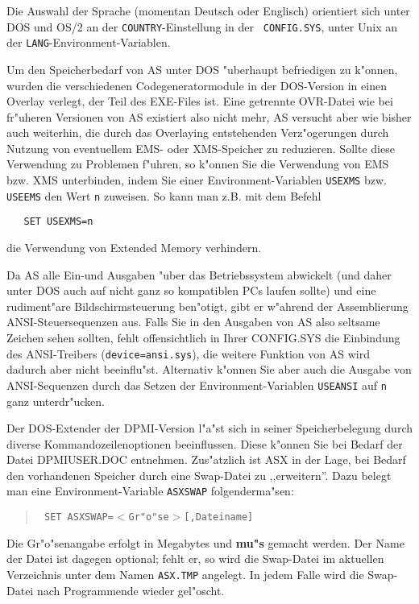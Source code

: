 \documentclass[12pt,a4paper,twoside]{report}
\newcommand{\bb}[1]{{\bf #1}}
\newcommand{\tty}[1]{{\tt #1}}
\begin{document}
Die Auswahl der Sprache (momentan Deutsch oder Englisch) orientiert sich
unter DOS und OS/2 an der {\tt COUNTRY}-Einstellung in der {\tt
CONFIG.SYS}, unter Unix an der {\tt LANG}-Environment-Variablen.

Um den  Speicherbedarf von AS unter DOS "uberhaupt
befriedigen zu k"onnen, wurden die verschiedenen Codegeneratormodule in
der DOS-Version in einen Overlay verlegt, der Teil des EXE-Files ist.
Eine getrennte OVR-Datei wie bei fr"uheren Versionen von AS existiert also
nicht mehr, AS versucht aber wie bisher auch weiterhin, die durch das
Overlaying entstehenden Verz"ogerungen durch Nutzung von eventuellem EMS-
oder XMS-Speicher zu reduzieren.  Sollte diese Verwendung zu Problemen
f"uhren, so k"onnen Sie die Verwendung von EMS bzw. XMS unterbinden, indem
Sie einer Environment-Variablen \tty{USEXMS} bzw. \tty{USEEMS} den Wert
\tty{n} zuweisen.  So kann man z.B. mit dem Befehl
\begin{verbatim}
   SET USEXMS=n
\end{verbatim}
die Verwendung von Extended Memory verhindern.
\par
Da AS alle Ein-und Ausgaben "uber das Betriebssystem abwickelt (und daher
unter DOS auch auf nicht ganz so kompatiblen PCs laufen sollte) und eine
rudiment"are Bildschirmsteuerung ben"otigt, gibt er w"ahrend der
Assemblierung ANSI-Steuersequenzen aus.
Falls Sie in den Ausgaben von AS  also seltsame
Zeichen sehen sollten, fehlt offensichtlich in Ihrer CONFIG.SYS die
Einbindung des ANSI-Trei\-bers (\tty{device=\-ansi.sys}), die weitere Funktion
von AS  wird dadurch aber nicht beeinflu"st. Alternativ
k"onnen Sie aber auch die Ausgabe von ANSI-Sequenzen durch das Setzen der
Environment-Variablen \tty{USEANSI} auf \tty{n} ganz unterdr"ucken.

Der DOS-Extender der DPMI-Version  l"a"st sich in
seiner Speicherbelegung durch diverse Kommandozeilenoptionen beeinflussen.
Diese k"onnen Sie bei Bedarf der Datei DPMIUSER.DOC entnehmen.
Zus"atzlich ist ASX in der Lage, bei Bedarf den vorhandenen Speicher
durch eine Swap-Datei zu ,,erweitern''.  Dazu belegt man eine
Environment-Variable \tty{ASXSWAP} folgenderma"sen:
\begin{quote}{\tt
  SET ASXSWAP=$<$Gr"o"se$>$[,Dateiname]
}\end{quote}
Die Gr"o"senangabe erfolgt in Megabytes und \bb{mu"s} gemacht werden.  Der
Name der Datei ist dagegen optional; fehlt er, so wird die Swap-Datei im
aktuellen Verzeichnis unter dem Namen \tty{ASX.TMP} angelegt.  In jedem
Falle wird die Swap-Datei nach Programmende wieder gel"oscht.
\end{document}
